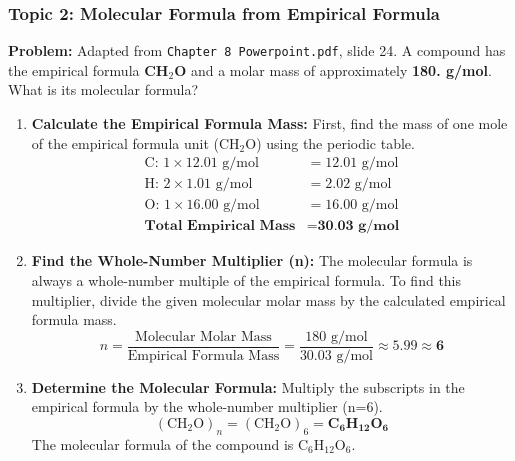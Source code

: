 \documentclass{article}
\begin{document}
\subsubsection*{Topic 2: Molecular Formula from Empirical Formula}
\textbf{Problem:} Adapted from \texttt{Chapter 8 Powerpoint.pdf}, slide 24. A compound has the empirical formula \textbf{CH$_2$O} and a molar mass of approximately \textbf{180. g/mol}. What is its molecular formula?
\begin{enumerate}
    \item \textbf{Calculate the Empirical Formula Mass:} First, find the mass of one mole of the empirical formula unit (CH$_2$O) using the periodic table.
    \begin{align*}
        \text{C: } 1 \times 12.01 \text{ g/mol} &= 12.01 \text{ g/mol} \\
        \text{H: } 2 \times 1.01 \text{ g/mol}  &= 2.02 \text{ g/mol} \\
        \text{O: } 1 \times 16.00 \text{ g/mol} &= 16.00 \text{ g/mol} \\
        \hline
        \textbf{Total Empirical Mass} &= \textbf{30.03 g/mol}
    \end{align*}

    \item \textbf{Find the Whole-Number Multiplier (n):} The molecular formula is always a whole-number multiple of the empirical formula. To find this multiplier, divide the given molecular molar mass by the calculated empirical formula mass.
    \[ n = \frac{\text{Molecular Molar Mass}}{\text{Empirical Formula Mass}} = \frac{180 \text{ g/mol}}{30.03 \text{ g/mol}} \approx 5.99 \approx \mathbf{6} \]

    \item \textbf{Determine the Molecular Formula:} Multiply the subscripts in the empirical formula by the whole-number multiplier (n=6).
    \[ (\text{CH}_2\text{O})_n = (\text{CH}_2\text{O})_6 = \mathbf{C_6H_{12}O_6} \]
    The molecular formula of the compound is C$_6$H$_{12}$O$_6$.
\end{enumerate}
\end{document}
